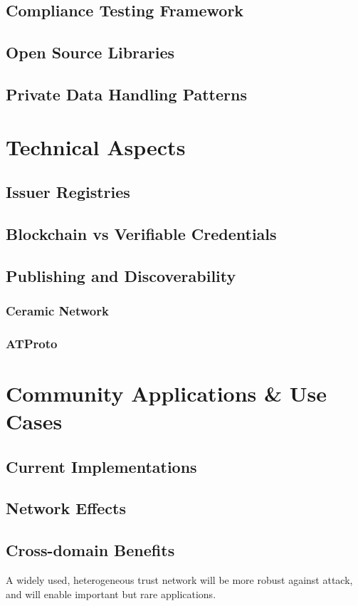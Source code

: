 \documentclass[11pt]{article}
\begin{document}
\subsection{Compliance Testing Framework}
\subsection{Open Source Libraries}
\subsection{Private Data Handling Patterns}

\section{Technical Aspects}
\subsection{Issuer Registries}
\subsection{Blockchain vs Verifiable Credentials}
\subsection{Publishing and Discoverability}
\subsubsection{Ceramic Network}
\subsubsection{ATProto}

\section{Community Applications \& Use Cases}
\subsection{Current Implementations}
\subsection{Network Effects}
\subsection{Cross-domain Benefits}
A widely used, heterogeneous trust network will be more robust against attack, and will enable important but rare applications.
\end{document}
